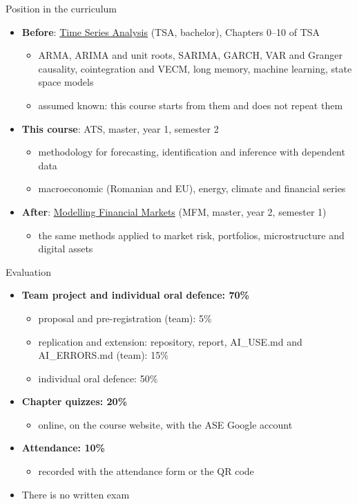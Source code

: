 \begin{frame}{Position in the curriculum}
\itemsize{\footnotesize}
\begin{itemize}
    \item \textbf{Before}: \href{https://danpele.github.io/Time-Series-Analysis/}{Time Series Analysis} (TSA, bachelor), Chapters 0--10 of TSA
    \begin{itemize}
        \item ARMA, ARIMA and unit roots, SARIMA, GARCH, VAR and Granger causality, cointegration and VECM, long memory, machine learning, state space models
        \item assumed known: this course starts from them and does not repeat them
    \end{itemize}
    \item \textbf{This course}: ATS, master, year 1, semester 2
    \begin{itemize}
        \item methodology for forecasting, identification and inference with dependent data
        \item macroeconomic (Romanian and EU), energy, climate and financial series
    \end{itemize}
    \item \textbf{After}: \href{https://danpele.github.io/MFM/}{Modelling Financial Markets} (MFM, master, year 2, semester 1)
    \begin{itemize}
        \item the same methods applied to market risk, portfolios, microstructure and digital assets
    \end{itemize}
\end{itemize}
\end{frame}

\begin{frame}{Evaluation}
\itemsize{\small}
\begin{itemize}
    \item \textbf{Team project and individual oral defence: 70\%}
    \begin{itemize}
        \item proposal and pre-registration (team): 5\%
        \item replication and extension: repository, report, AI\_USE.md and AI\_ERRORS.md (team): 15\%
        \item individual oral defence: 50\%
    \end{itemize}
    \item \textbf{Chapter quizzes: 20\%}
    \begin{itemize}
        \item online, on the course website, with the ASE Google account
    \end{itemize}
    \item \textbf{Attendance: 10\%}
    \begin{itemize}
        \item recorded with the attendance form or the QR code
    \end{itemize}
    \item There is no written exam
\end{itemize}
\end{frame}

